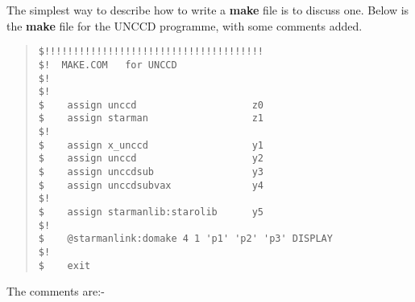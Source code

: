 The simplest way to describe how to write a {\bf make} file is to discuss
one. Below is the {\bf make} file for the UNCCD programme, with some 
comments added.

\begin{quote}
\begin{tabbing}
\verb#$!!!!!!!!!!!!!!!!!!!!!!!!!!!!!!!!!!!!!!                       #\\
\verb#$!  MAKE.COM   for UNCCD                                      #\\
\verb#$!                                                            #\\
\verb#$!                                                            #\\
\verb#$    assign unccd                    z0                       # \\
\verb#$    assign starman                  z1                       # \\
\verb#$!                                                            #\\
\verb#$    assign x_unccd                  y1                       # \\
\verb#$    assign unccd                    y2                       # \\
\verb#$    assign unccdsub                 y3                       # \\
\verb#$    assign unccdsubvax              y4                       #\\
\verb#$!                                                            #\\
\verb#$    assign starmanlib:starolib      y5                       # \\
\verb#$!                                                            #\\
\verb#$    @starmanlink:domake 4 1 'p1' 'p2' 'p3' DISPLAY           # \\
\verb#$!                                                            #\\
\verb#$    exit                                                     #\\
\end{tabbing}
\end{quote}

The comments are:-

